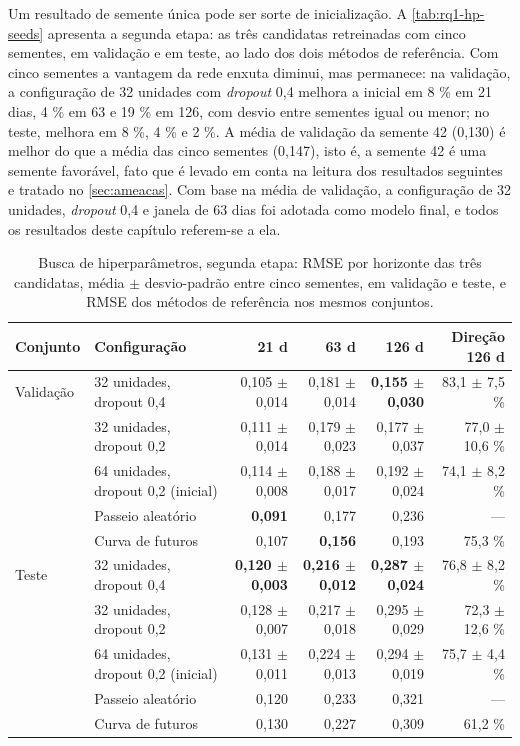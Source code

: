 Um resultado de semente única pode ser sorte de inicialização. A \autoref{tab:rq1-hp-seeds} apresenta a segunda etapa: as três candidatas retreinadas com cinco sementes, em validação e em teste, ao lado dos dois métodos de referência. Com cinco sementes a vantagem da rede enxuta diminui, mas permanece: na validação, a configuração de 32 unidades com \textit{dropout} 0,4 melhora a inicial em 8 \% em 21 dias, 4 \% em 63 e 19 \% em 126, com desvio entre sementes igual ou menor; no teste, melhora em 8 \%, 4 \% e 2 \%. A média de validação da semente 42 (0,130) é melhor do que a média das cinco sementes (0,147), isto é, a semente 42 é uma semente favorável, fato que é levado em conta na leitura dos resultados seguintes e tratado no \autoref{sec:ameacas}. Com base na média de validação, a configuração de 32 unidades, \textit{dropout} 0,4 e janela de 63 dias foi adotada como modelo final, e todos os resultados deste capítulo referem-se a ela.

\begin{table}[htb]
	\centering
	\caption{Busca de hiperparâmetros, segunda etapa: RMSE por horizonte das três candidatas, média $\pm$ desvio-padrão entre cinco sementes, em validação e teste, e RMSE dos métodos de referência nos mesmos conjuntos.}\label{tab:rq1-hp-seeds}
	\footnotesize
	\setlength{\tabcolsep}{3.5pt}
	\begin{tabular}{l l r r r r}
		\hline
		\textbf{Conjunto} & \textbf{Configuração} & \textbf{21 d} & \textbf{63 d} & \textbf{126 d} & \textbf{Direção 126 d} \\ \hline
		Validação & 32 unidades, dropout 0,4 & 0,105 $\pm$ 0,014 & 0,181 $\pm$ 0,014 & \textbf{0,155 $\pm$ 0,030} & 83,1 $\pm$ 7,5 \% \\
		          & 32 unidades, dropout 0,2 & 0,111 $\pm$ 0,014 & 0,179 $\pm$ 0,023 & 0,177 $\pm$ 0,037 & 77,0 $\pm$ 10,6 \% \\
		          & 64 unidades, dropout 0,2 (inicial) & 0,114 $\pm$ 0,008 & 0,188 $\pm$ 0,017 & 0,192 $\pm$ 0,024 & 74,1 $\pm$ 8,2 \% \\
		          & Passeio aleatório & \textbf{0,091} & 0,177 & 0,236 & --- \\
		          & Curva de futuros & 0,107 & \textbf{0,156} & 0,193 & 75,3 \% \\ \hline
		Teste     & 32 unidades, dropout 0,4 & \textbf{0,120 $\pm$ 0,003} & \textbf{0,216 $\pm$ 0,012} & \textbf{0,287 $\pm$ 0,024} & 76,8 $\pm$ 8,2 \% \\
		          & 32 unidades, dropout 0,2 & 0,128 $\pm$ 0,007 & 0,217 $\pm$ 0,018 & 0,295 $\pm$ 0,029 & 72,3 $\pm$ 12,6 \% \\
		          & 64 unidades, dropout 0,2 (inicial) & 0,131 $\pm$ 0,011 & 0,224 $\pm$ 0,013 & 0,294 $\pm$ 0,019 & 75,7 $\pm$ 4,4 \% \\
		          & Passeio aleatório & 0,120 & 0,233 & 0,321 & --- \\
		          & Curva de futuros & 0,130 & 0,227 & 0,309 & 61,2 \% \\ \hline
	\end{tabular}
\end{table}

